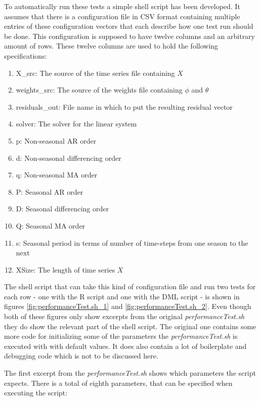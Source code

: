 To automatically run these tests a simple shell script has been developed. It assumes that there is a configuration file in \acs{CSV} format containing multiple entries of these configuration vectors that each describe how one test run should be done. This configuration is supposed to have twelve columns and an arbitrary amount of rows. These twelve columns are used to hold the following specifications:
\begin{enumerate}
    \item X\_src: The source of the time series file containing $X$
    \item weights\_src: The source of the weights file containing $\phi$ and $\theta$
    \item residuals\_out: File name in which to put the resulting residual vector
    \item solver: The solver for the linear system
    \item p: Non-seasonal \acs{AR} order
    \item d: Non-seasonal differencing order
    \item q: Non-seasonal \acs{MA} order
    \item P: Seasonal \acs{AR} order
    \item D: Seasonal differencing order
    \item Q: Seasonal \acs{MA} order
    \item s: Seasonal period in terms of number of time-steps from one season to the next
    \item XSize: The length of time series $X$
\end{enumerate}

The shell script that can take this kind of configuration file and run two tests for each row - one with the R script and one with the \acs{DML} script - is shown in figures \ref{fig:performanceTest.sh_1} and \ref{fig:performanceTest.sh_2}. Even though both of these figures only show excerpts from the original \textit{performanceTest.sh} they do show the relevant part of the shell script. The original one contains some more code for initializing some of the parameters the \textit{performanceTest.sh} is executed with with default values. It does also contain a lot of boilerplate and debugging code which is not to be discussed here.

The first excerpt from the \textit{performanceTest.sh} shows which parameters the script expects. There is a total of eighth parameters, that can be specified when executing the script:

